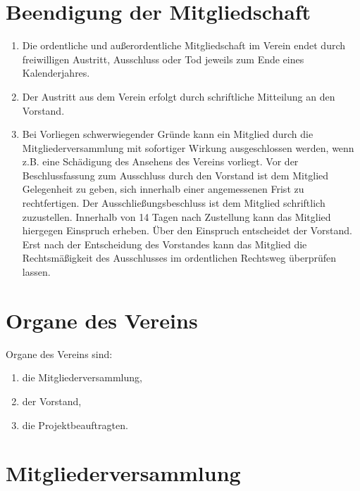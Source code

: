 \documentclass[
  fontsize=12pt,
  paper=a4,
  DIV14,
  parskip,
]{scrartcl}
\begin{document}
\section{Beendigung der Mitgliedschaft}

\begin{enumerate}
	\item Die ordentliche und außerordentliche Mitgliedschaft im Verein endet
		durch freiwilligen Austritt, Ausschluss oder Tod jeweils zum Ende eines
		Kalenderjahres.
	\item Der Austritt aus dem Verein erfolgt durch schriftliche Mitteilung an
		den Vorstand.
	\item Bei Vorliegen schwerwiegender Gründe kann ein Mitglied durch die
		Mitgliederversammlung mit sofortiger Wirkung ausgeschlossen werden,
		wenn z.B. eine Schädigung des Ansehens des Vereins vorliegt.
		Vor der Beschlussfassung zum Ausschluss durch den Vorstand ist dem
		Mitglied Gelegenheit zu geben, sich innerhalb einer angemessenen Frist
		zu rechtfertigen. Der Ausschließungsbeschluss ist dem Mitglied schriftlich
		zuzustellen. Innerhalb von 14 Tagen nach Zustellung kann das Mitglied
		hiergegen Einspruch erheben.
		Über den Einspruch entscheidet der Vorstand. Erst nach der Entscheidung
		des Vorstandes kann das Mitglied die Rechtsmäßigkeit des Ausschlusses im
		ordentlichen Rechtsweg überprüfen lassen.
\end{enumerate}

\section{Organe des Vereins}

Organe des Vereins sind:
	\begin{enumerate}
		\item die Mitgliederversammlung,
		\item der Vorstand,
		\item die Projektbeauftragten.
	\end{enumerate}

\section{Mitgliederversammlung}
\end{document}

